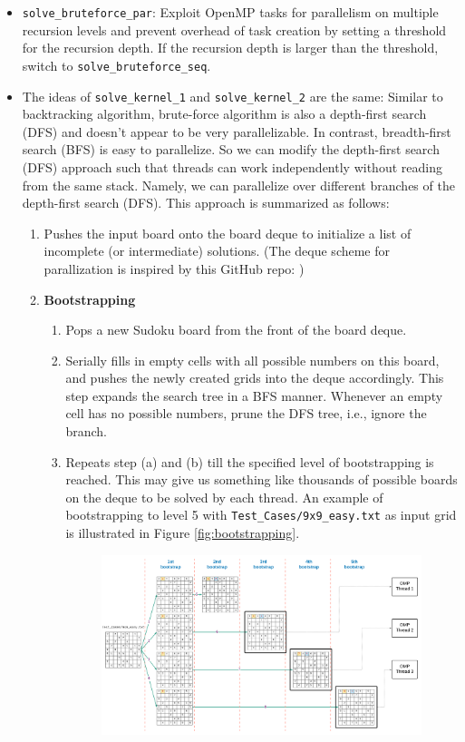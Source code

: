 \documentclass[12pt,a4paper]{article}
\newcommand{\code}[1]{\colorbox{light-gray}{\texttt{#1}}}
\begin{document}
		\begin{itemize}[itemsep=0pt, parsep=0pt]
			\item \code{solve\_bruteforce\_par}: Exploit OpenMP tasks for parallelism on multiple recursion levels and
			prevent overhead of task creation by setting a threshold for the recursion depth.
			If the recursion depth is larger than the threshold, switch to \code{solve\_bruteforce\_seq}.
			\item The ideas of \code{solve\_kernel\_1} and \code{solve\_kernel\_2} are the same: Similar to backtracking algorithm, brute-force algorithm is also a depth-first search (DFS) and doesn't appear to be very parallelizable.
			In contrast, breadth-first search (BFS) is easy to parallelize. So we can modify the depth-first search (DFS) approach such that threads can work independently without reading from the same stack.
			Namely, we can parallelize over different branches of the depth-first search (DFS). This approach is summarized as follows:
			\begin{enumerate}[itemsep=0pt, parsep=0pt]
				\item Pushes the input board onto the board deque to initialize a list of incomplete (or intermediate) solutions.
				(The deque scheme for parallization is inspired by this GitHub repo: \cite{github:chr1shr})
				\item \textbf{Bootstrapping}
					\begin{enumerate}[itemsep=0pt, parsep=0pt] 	
						\item Pops a new Sudoku board from the front of the board deque.
						\item Serially fills in empty cells with all possible numbers on this board, and pushes the newly created grids into the deque accordingly.
						This step expands the search tree in a BFS manner. Whenever an empty cell has no possible numbers, prune the DFS tree, i.e., ignore the branch.
						\item Repeats step (a) and (b) till the specified level of bootstrapping is reached.
						This may give us something like thousands of possible boards on the deque to be solved by each thread. 
						An example of bootstrapping to level \num{5} with \code{Test\_Cases/9x9\_easy.txt} as input grid is illustrated in Figure \ref{fig:bootstrapping}.
						\begin{figure}[H]
							\centering
							\includegraphics[width=\linewidth]{Bootstrapping}

\end{figure}
\end{enumerate}
\end{enumerate}
\end{itemize}
\end{document}

